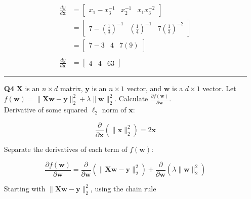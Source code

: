 \documentclass[letterpaper,12pt]{article}
\begin{document}
\begin{itemize}
        \[ 
            \begin{split}
                \frac{dy}{d\mathbf{x}} & = \begin{bmatrix} x_{1} - x_{3}^{-1} & x_{2}^{-1} & x_{1} x_{3}^{-2} \end{bmatrix} \\
                & = \begin{bmatrix} 7 - (\frac{1}{3})^{-1} & (\frac{1}{4})^{-1} & 7 (\frac{1}{3})^{-2} \end{bmatrix} \\
                & = \begin{bmatrix} 7 - 3 & 4 & 7 (9) \end{bmatrix} \\ \\
                \frac{dy}{d\mathbf{x}} & = \begin{bmatrix} 4 & 4 & 63 \end{bmatrix}
            \end{split}
        \]


    \vspace{2mm}
    \hrule
    \vspace{2mm}
    
    
    \item[\textbf{Q4}] $\mathbf{X}$ is an $n \times d$ matrix, $\mathbf{y}$ is an $n \times 1$ vector, and $\mathbf{w}$ is a $d \times 1$ vector. Let $f(\mathbf{w}) = \|\mathbf{Xw} - \mathbf{y}\|_{2}^{2} + \lambda \|\mathbf{w}\|_{2}^{2}$. Calculate $\frac{\partial f(\mathbf{w})}{\partial \mathbf{w}}$. \\
    
    Derivative of some squared $\ell_{2}$ norm of $\mathbf{x}$:


        \[ \frac{\partial}{\partial \mathbf{x}} (\|\mathbf{x}\|_{2}^{2}) = 2 \mathbf{x} \]

    Separate the derivatives of each term of $f(\mathbf{w})$:

        \[ \frac{\partial f(\mathbf{w})}{\partial \mathbf{w}} = \frac{\partial}{\partial \mathbf{w}} (\|\mathbf{Xw} - \mathbf{y}\|_{2}^{2}) + \frac{\partial}{\partial \mathbf{w}} (\lambda \|\mathbf{w}\|_{2}^{2}) \]

    Starting with $\|\mathbf{Xw} - \mathbf{y}\|_{2}^{2}$, using the chain rule


\end{itemize}
\end{document}

